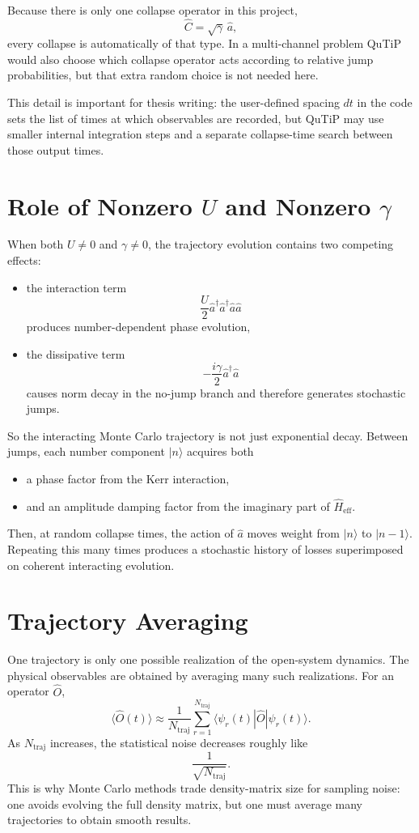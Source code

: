 \documentclass[12pt]{article}
\begin{document}
Because there is only one collapse operator in this project,
\[
\hat C = \sqrt{\gamma}\,\hat a,
\]
every collapse is automatically of that type. In a multi-channel problem QuTiP would also choose which collapse operator acts according to relative jump probabilities, but that extra random choice is not needed here.

This detail is important for thesis writing: the user-defined spacing $dt$ in the code sets the list of times at which observables are recorded, but QuTiP may use smaller internal integration steps and a separate collapse-time search between those output times.

\section*{Role of Nonzero $U$ and Nonzero $\gamma$}
When both $U\neq 0$ and $\gamma\neq 0$, the trajectory evolution contains two competing effects:
\begin{itemize}
\item the interaction term
\[
\frac{U}{2}\hat a^\dagger \hat a^\dagger \hat a \hat a
\]
produces number-dependent phase evolution,
\item the dissipative term
\[
-\frac{i\gamma}{2}\hat a^\dagger \hat a
\]
causes norm decay in the no-jump branch and therefore generates stochastic jumps.
\end{itemize}

So the interacting Monte Carlo trajectory is not just exponential decay. Between jumps, each number component $|n\rangle$ acquires both
\begin{itemize}
\item a phase factor from the Kerr interaction,
\item and an amplitude damping factor from the imaginary part of $\hat H_{\mathrm{eff}}$.
\end{itemize}
Then, at random collapse times, the action of $\hat a$ moves weight from $|n\rangle$ to $|n-1\rangle$. Repeating this many times produces a stochastic history of losses superimposed on coherent interacting evolution.

\section*{Trajectory Averaging}
One trajectory is only one possible realization of the open-system dynamics. The physical observables are obtained by averaging many such realizations. For an operator $\hat O$,
\[
\langle \hat O(t)\rangle
\approx \frac{1}{N_{\mathrm{traj}}}\sum_{r=1}^{N_{\mathrm{traj}}}
\langle \psi_r(t)|\hat O|\psi_r(t)\rangle.
\]
As $N_{\mathrm{traj}}$ increases, the statistical noise decreases roughly like
\[
\frac{1}{\sqrt{N_{\mathrm{traj}}}}.
\]
This is why Monte Carlo methods trade density-matrix size for sampling noise: one avoids evolving the full density matrix, but one must average many trajectories to obtain smooth results.
\end{document}
